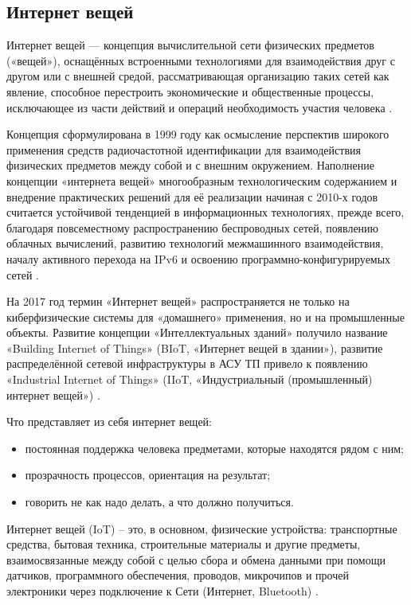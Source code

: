 \subsection{Интернет вещей}
\label{sec:subject:iot}

Интернет вещей — концепция вычислительной сети физических предметов («вещей»), оснащённых встроенными технологиями для взаимодействия друг с другом или с внешней средой, рассматривающая организацию таких сетей как явление, способное перестроить экономические и общественные процессы, исключающее из части действий и операций необходимость участия человека \cite{wiki_iot}.

Концепция сформулирована в 1999 году как осмысление перспектив широкого применения средств радиочастотной идентификации для взаимодействия физических предметов между собой и с внешним окружением. Наполнение концепции «интернета вещей» многообразным технологическим содержанием и внедрение практических решений для её реализации начиная с 2010-х годов считается устойчивой тенденцией в информационных технологиях, прежде всего, благодаря повсеместному распространению беспроводных сетей, появлению облачных вычислений, развитию технологий межмашинного взаимодействия, началу активного перехода на IPv6 и освоению программно-конфигурируемых сетей \cite{wiki_iot}.

На 2017 год термин «Интернет вещей» распространяется не только на киберфизические системы для «домашнего» применения, но и на промышленные объекты. Развитие концепции «Интеллектуальных зданий» получило название «Building Internet of Things» (BIoT, «Интернет вещей в здании»), развитие распределённой сетевой инфраструктуры в АСУ ТП привело к появлению «Industrial Internet of Things» (IIoT, «Индустриальный (промышленный) интернет вещей») \cite{wiki_iot}.

Что представляет из себя интернет вещей:
\begin{itemize}
	\item постоянная поддержка человека предметами, которые находятся рядом с ним;
	\item прозрачность процессов, ориентация на результат;
	\item говорить не как надо делать, а что должно получиться.
\end{itemize}

Интернет вещей (IoT) – это, в основном, физические устройства: транспортные средства, бытовая техника, строительные материалы и другие предметы, взаимосвязанные между собой с целью сбора и обмена данными при помощи датчиков, программного обеспечения, проводов, микрочипов и прочей электроники через подключение к Сети (Интернет, Bluetooth) \cite{what_is_iot}.

